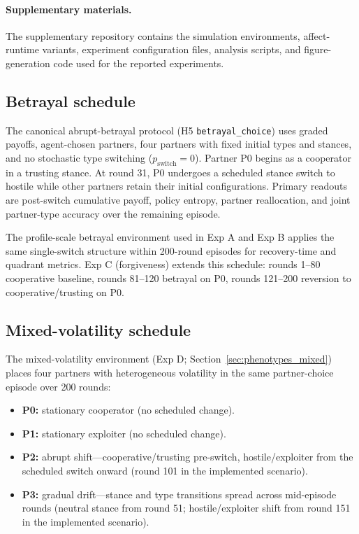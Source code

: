 \paragraph{Supplementary materials.}
The supplementary repository contains the simulation environments, affect-runtime variants, experiment configuration files, analysis scripts, and figure-generation code used for the reported experiments.

\subsection{Betrayal schedule}

The canonical abrupt-betrayal protocol (H5 \texttt{betrayal\_choice}) uses graded payoffs, agent-chosen partners, four partners with fixed initial types and stances, and no stochastic type switching ($p_{\mathrm{switch}}=0$). Partner P0 begins as a cooperator in a trusting stance. At round 31, P0 undergoes a scheduled stance switch to hostile while other partners retain their initial configurations. Primary readouts are post-switch cumulative payoff, policy entropy, partner reallocation, and joint partner-type accuracy over the remaining episode.

The profile-scale betrayal environment used in Exp A and Exp B applies the same single-switch structure within 200-round episodes for recovery-time and quadrant metrics. Exp C (forgiveness) extends this schedule: rounds 1--80 cooperative baseline, rounds 81--120 betrayal on P0, rounds 121--200 reversion to cooperative/trusting on P0.

\subsection{Mixed-volatility schedule}

The mixed-volatility environment (Exp D; Section~\ref{sec:phenotypes_mixed}) places four partners with heterogeneous volatility in the same partner-choice episode over 200 rounds:

\begin{itemize}
\item \textbf{P0:} stationary cooperator (no scheduled change).
\item \textbf{P1:} stationary exploiter (no scheduled change).
\item \textbf{P2:} abrupt shift---cooperative/trusting pre-switch, hostile/exploiter from the scheduled switch onward (round 101 in the implemented scenario).
\item \textbf{P3:} gradual drift---stance and type transitions spread across mid-episode rounds (neutral stance from round 51; hostile/exploiter shift from round 151 in the implemented scenario).
\end{itemize}


